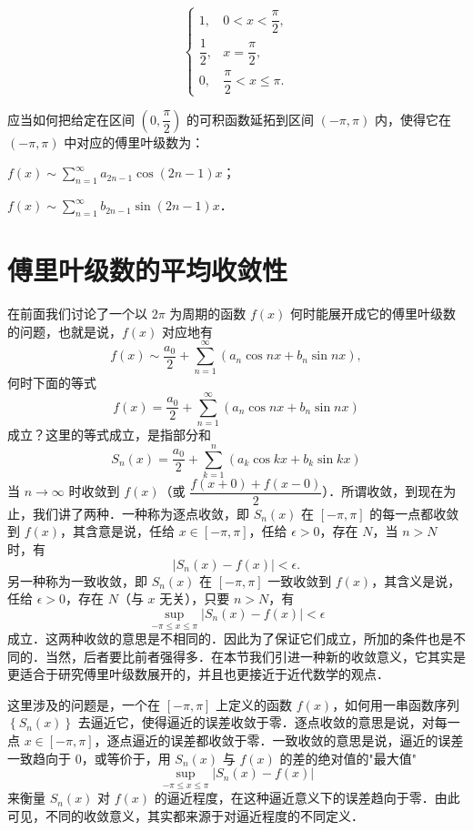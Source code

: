\begin{xiti}
\[\begin{cases}
1, & 0<x<\dfrac{\pi}{2},\\[4pt]
\dfrac{1}{2}, & x=\dfrac{\pi}{2},\\[4pt]
0, & \dfrac{\pi}{2}<x\leqslant\pi.
\end{cases}
\]
\item 应当如何把给定在区间 $\left(0,\dfrac{\pi}{2}\right)$ 的可积函数延拓到区间 $(-\pi,\pi)$ 内，使得它在 $(-\pi,\pi)$ 中对应的傅里叶级数为：
\begin{ziti}
\item $f(x)\sim\displaystyle\sum_{n=1}^{\infty}a_{2n-1}\cos(2n-1)x$；
\item $f(x)\sim\displaystyle\sum_{n=1}^{\infty}b_{2n-1}\sin(2n-1)x$．
\end{ziti}
\end{xiti}

\section{傅里叶级数的平均收敛性}

在前面我们讨论了一个以 $2\pi$ 为周期的函数 $f(x)$ 何时能展开成它的傅里叶级数的问题，也就是说，$f(x)$ 对应地有
\[
f(x)\sim\frac{a_{0}}{2}+\sum_{n=1}^{\infty}\left(a_{n}\cos nx+b_{n}\sin nx\right),
\]
何时下面的等式
\[
f(x)=\frac{a_{0}}{2}+\sum_{n=1}^{\infty}\left(a_{n}\cos nx+b_{n}\sin nx\right)
\]
成立？这里的等式成立，是指部分和
\[
S_{n}(x)=\frac{a_{0}}{2}+\sum_{k=1}^{n}\left(a_{k}\cos kx+b_{k}\sin kx\right)
\]
当 $n\to\infty$ 时收敛到 $f(x)$（或 $\dfrac{f(x+0)+f(x-0)}{2}$）．所谓收敛，到现在为止，我们讲了两种．一种称为逐点收敛，即 $S_{n}(x)$ 在 $[-\pi,\pi]$ 的每一点都收敛到 $f(x)$，其含意是说，任给 $x\in[-\pi,\pi]$，任给 $\epsilon>0$，存在 $N$，当 $n>N$ 时，有
\[
\left|S_{n}(x)-f(x)\right|<\epsilon.
\]
另一种称为一致收敛，即 $S_{n}(x)$ 在 $[-\pi,\pi]$ 一致收敛到 $f(x)$，其含义是说，任给 $\epsilon>0$，存在 $N$（与 $x$ 无关），只要 $n>N$，有
\[
\sup_{-\pi\leqslant x\leqslant\pi}\left|S_{n}(x)-f(x)\right|<\epsilon
\]
成立．这两种收敛的意思是不相同的．因此为了保证它们成立，所加的条件也是不同的．当然，后者要比前者强得多．在本节我们引进一种新的收敛意义，它其实是更适合于研究傅里叶级数展开的，并且也更接近于近代数学的观点．

这里涉及的问题是，一个在 $[-\pi,\pi]$ 上定义的函数 $f(x)$，如何用一串函数序列 $\left\{S_{n}(x)\right\}$ 去逼近它，使得逼近的误差收敛于零．逐点收敛的意思是说，对每一点 $x\in[-\pi,\pi]$，逐点逼近的误差都收敛于零．一致收敛的意思是说，逼近的误差一致趋向于 $0$，或等价于，用 $S_{n}(x)$ 与 $f(x)$ 的差的绝对值的"最大值"
\[
\sup_{-\pi\leqslant x\leqslant\pi}\left|S_{n}(x)-f(x)\right|
\]
来衡量 $S_{n}(x)$ 对 $f(x)$ 的逼近程度，在这种逼近意义下的误差趋向于零．由此可见，不同的收敛意义，其实都来源于对逼近程度的不同定义．

